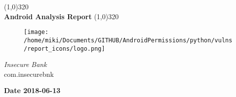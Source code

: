 \documentclass[12p]{article}
\begin{document}
\begin{titlepage}
\begin{center}
\line(1,0){320}\\
[0.25in]
\huge{\bfseries Android Analysis Report}
\line(1,0){320}\\
[0.5in]
\begin{figure}[H]
	\centering
	\texttt{[image: /home/miki/Documents/GITHUB/AndroidPermissions/python/vulns/report\_icons/logo.png]}
\end{figure}
\textsl{\LARGE Insecure Bank}\\
\textsf{\LARGE com.insecurebnk}\\
[2.5in]
\end{center}
\begin{flushright}
\textbf{\large Date 2018-06-13}
\end{flushright}
\end{titlepage}
\tableofcontents
\thispagestyle{empty}
\cleardoublepage
\setcounter{page}{1}
\end{document}
